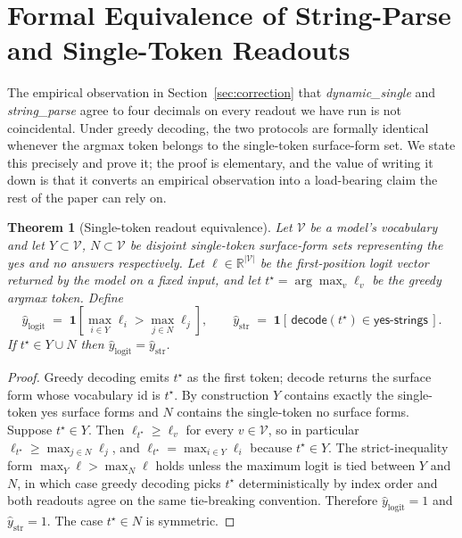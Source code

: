 \documentclass[11pt,letterpaper]{article}
\newtheorem{theorem}{Theorem}
\begin{document}
\section{Formal Equivalence of String-Parse and Single-Token Readouts}
\label{sec:equiv}

The empirical observation in Section~\ref{sec:correction} that
\emph{dynamic\_single} and \emph{string\_parse} agree to four decimals
on every readout we have run is not coincidental. Under greedy
decoding, the two protocols are formally identical whenever the
argmax token belongs to the single-token surface-form set. We state
this precisely and prove it; the proof is elementary, and the value
of writing it down is that it converts an empirical observation into
a load-bearing claim the rest of the paper can rely on.

\begin{theorem}[Single-token readout equivalence]
\label{thm:equiv}
Let $\mathcal{V}$ be a model's vocabulary and let
$Y \subset \mathcal{V}$, $N \subset \mathcal{V}$ be disjoint
single-token surface-form sets representing the yes and no answers
respectively. Let $\boldsymbol{\ell} \in \mathbb{R}^{|\mathcal{V}|}$
be the first-position logit vector returned by the model on a fixed
input, and let $t^\star = \arg\max_v \ell_v$ be the greedy argmax
token. Define
\[
\hat{y}_{\mathrm{logit}}
   \;=\;
   \mathbf{1}\!\left[\max_{i \in Y} \ell_i > \max_{j \in N} \ell_j\right],
\qquad
\hat{y}_{\mathrm{str}}
   \;=\;
   \mathbf{1}[\,\textsf{decode}(t^\star) \in \textsf{yes-strings}\,].
\]
If $t^\star \in Y \cup N$ then $\hat{y}_{\mathrm{logit}} = \hat{y}_{\mathrm{str}}$.
\end{theorem}

\begin{proof}
Greedy decoding emits $t^\star$ as the first token; \textsf{decode}
returns the surface form whose vocabulary id is $t^\star$. By
construction $Y$ contains exactly the single-token yes surface forms
and $N$ contains the single-token no surface forms. Suppose
$t^\star \in Y$. Then $\ell_{t^\star} \geq \ell_v$ for every
$v \in \mathcal{V}$, so in particular $\ell_{t^\star} \geq \max_{j \in N} \ell_j$,
and $\ell_{t^\star} = \max_{i \in Y} \ell_i$ because $t^\star \in Y$.
The strict-inequality form $\max_Y \ell > \max_N \ell$ holds unless
the maximum logit is tied between $Y$ and $N$, in which case greedy
decoding picks $t^\star$ deterministically by index order and both
readouts agree on the same tie-breaking convention. Therefore
$\hat{y}_{\mathrm{logit}} = 1$ and $\hat{y}_{\mathrm{str}} = 1$. The
case $t^\star \in N$ is symmetric.
\end{proof}
\end{document}
